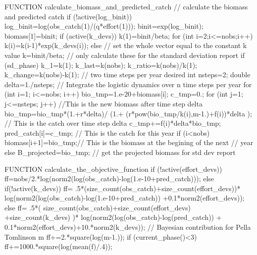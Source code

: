 \documentclass[12pt]{book}
\begin{document}
FUNCTION calculate_biomass_and_predicted_catch
  // calculate the biomass and predicted catch
  if (!active(log_binit))
  {
    log_binit=log(obs_catch(1)/(q*effort(1)));
  }
  binit=exp(log_binit);
  biomass[1]=binit;
  if (active(k_devs))
  {
    k(1)=binit/beta;
    for (int i=2;i<=nobs;i++)
    {
      k(i)=k(i-1)*exp(k_devs(i));
    }
  }
  else
  {
    // set the whole vector equal to the constant k value
    k=binit/beta;
  }
  // only calculate these for the standard deviation report
  if (sd_phase)
  {
    k_1=k(1);
    k_last=k(nobs);
    k_ratio=k(nobs)/k(1);
    k_change=k(nobs)-k(1);
  }
  // two time steps per year desired
  int nsteps=2;
  double delta=1./nsteps;
  // Integrate the logistic dynamics over n time steps per year
  for (int i=1; i<=nobs; i++)
  {
    bio_tmp=1.e-20+biomass[i];
    c_tmp=0.;
    for (int j=1; j<=nsteps; j++)
    {
      //This is the new biomass after time step delta
      bio_tmp=bio_tmp*(1.+r*delta)/
        (1.+ (r*pow(bio_tmp/k(i),m-1.)+f(i))*delta );
      // This is the catch over time step delta
      c_tmp+=f(i)*delta*bio_tmp;
    }
    pred_catch[i]=c_tmp;        // This is the catch for this year
    if (i<nobs)
    {
      biomass[i+1]=bio_tmp;// This is the biomass at the begining of the next
    }                      // year
    else
    {
      B_projected=bio_tmp; // get the projected biomass for std dev report
    }
  }

FUNCTION calculate_the_objective_function
  if (!active(effort_devs))
  {
    ff=nobs/2.*log(norm2(log(obs_catch)-log(1.e-10+pred_catch)));
  }
  else if(!active(k_devs))
  {
    ff= .5*(size_count(obs_catch)+size_count(effort_devs))*
      log(norm2(log(obs_catch)-log(1.e-10+pred_catch))
      +0.1*norm2(effort_devs));
  }
  else 
  {
    ff= .5*( size_count(obs_catch)+size_count(effort_devs)
      +size_count(k_devs) )*
      log(norm2(log(obs_catch)-log(pred_catch))
      + 0.1*norm2(effort_devs)+10.*norm2(k_devs));
  }
  // Bayesian contribution for Pella Tomlinson m
  ff+=2.*square(log(m-1.));
  if (current_phase()<3)
  {
    ff+=1000.*square(log(mean(f)/.4));
  }
\end{document}
